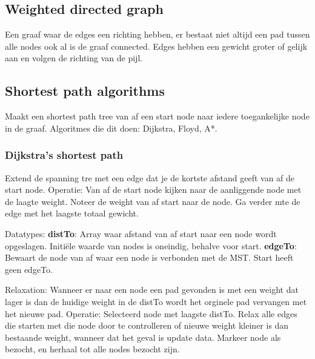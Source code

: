 \subsection{Weighted directed graph}
Een graaf waar de edges een richting hebben, er bestaat niet altijd een pad tussen alle nodes ook al is de graaf connected.
Edges hebben een gewicht groter of gelijk aan en volgen de richting van de pijl.

\subsection{Shortest path algorithms}
Maakt een shortest path tree van af een start node naar iedere toegankelijke node in de graaf.
Algoritmes die dit doen: Dijkstra, Floyd, A*.

\subsubsection{Dijkstra's shortest path}
Extend de spanning tre met een edge dat je de kortste afstand geeft van af de start node.
Operatie:
Van af de start node kijken naar de aanliggende node met de laagte weight.
Noteer de weight van af start naar de node.
Ga verder mte de edge met het laagste totaal gewicht.

Datatypes: 
\textbf{distTo}: Array waar afstand van af start naar een node wordt opgeslagen.
Initiële waarde van nodes is oneindig, behalve voor start.
\textbf{edgeTo}: Bewaart de node van af waar een node is verbonden met de MST.
Start heeft geen edgeTo.

Relaxation:
Wanneer er naar een node een pad gevonden is met een weight dat lager is dan de huidige weight in de distTo wordt het orginele pad vervangen met het nieuwe pad.
Operatie:
Selecteerd node met laagste distTo.
Relax alle edges die starten met die node door te controlleren of nieuwe weight kleiner is dan bestaande weight, wanneer dat het geval is update data.
Markeer node als bezocht, en herhaal tot alle nodes bezocht zijn.
